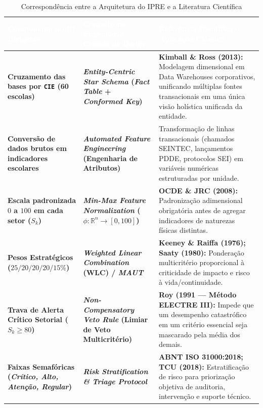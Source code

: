 \documentclass[9pt,a4paper]{extarticle}
\begin{document}
\begin{table}[htbp]
\centering
\small
\renewcommand{\arraystretch}{1.26}
\caption{Correspondência entre a Arquitetura do IPRE e a Literatura Científica}
\label{tab:equivalencia_literatura}
\begin{tabularx}{\textwidth}{>{\bfseries\color{ureNavy}}p{3.6cm} >{\bfseries\color{ureBlue}}p{4.4cm} X}
\toprule
\rowcolor{ureNavy} \textcolor{white}{Componente no BI Dirigente} & \textcolor{white}{Conceito na Engenharia / Ciência de Dados} & \textcolor{white}{\textbf{Referência Científica e Aplicação Clássica}} \\
\midrule
Cruzamento das bases por \texttt{CIE} (60 escolas) & \emph{Entity-Centric Star Schema} (\emph{Fact Table} + \emph{Conformed Key}) & \textbf{Kimball \& Ross (2013):} Modelagem dimensional em Data Warehouses corporativos, unificando múltiplas fontes transacionais em uma única visão holística unificada da entidade. \\
\rowcolor{ureLight} Conversão de dados brutos em indicadores escolares & \emph{Automated Feature Engineering} (Engenharia de Atributos) & Transformação de linhas transacionais (chamados SEINTEC, lançamentos PDDE, protocolos SEI) em variáveis numéricas estruturadas por unidade. \\
Escala padronizada $0$ a $100$ em cada setor ($S_k$) & \emph{Min-Max Feature Normalization} ($\phi: \mathbb{R}^n \to [0,100]$) & \textbf{OCDE \& JRC (2008):} Padronização adimensional obrigatória antes de agregar indicadores de naturezas físicas distintas. \\
\rowcolor{ureLight} Pesos Estratégicos ($25/20/20/20/15\%$) & \emph{Weighted Linear Combination} (WLC) / \emph{MAUT} & \textbf{Keeney \& Raiffa (1976); Saaty (1980):} Ponderação multicritério proporcional à criticidade de impacto e risco à vida/continuidade. \\
Trava de Alerta Crítico Setorial ($S_k \ge 80$) & \emph{Non-Compensatory Veto Rule} (Limiar de Veto Multicritério) & \textbf{Roy (1991 --- Método ELECTRE III):} Impede que um desempenho catastrófico em um critério essencial seja mascarado pela média dos demais. \\
\rowcolor{ureLight} Faixas Semafóricas (\emph{Crítico, Alto, Atenção, Regular}) & \emph{Risk Stratification \& Triage Protocol} & \textbf{ABNT ISO 31000:2018; TCU (2018):} Estratificação de risco para priorização objetiva de auditoria, intervenção e suporte técnico. \\
\bottomrule
\end{tabularx}
\end{table}
\end{document}
